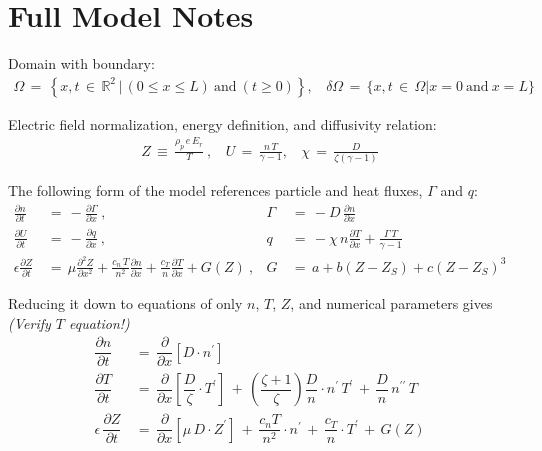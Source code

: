 \documentclass[a4paper,8pt]{article}
\date{}
\begin{document}
\hypertarget{full-model-notes}{%
\section{Full Model Notes}\label{full-model-notes}}

Domain with boundary: \begin{align}
    \Omega \,=\, \left\{x, t \,\in\, \mathbb{R}^2 \,|\, (0 \leq x \leq L) ~\text{and}~ (t \geq 0)\right\}, ~~~~ \delta\Omega \,=\, \{x, t \,\in\, \Omega | x = 0 ~\text{and}~ x = L \}
\end{align}

Electric field normalization, energy definition, and diffusivity
relation: \begin{align}
    Z \,\equiv\, \frac{\rho_p \, e \, E_r}{T}~, ~~~~ U \,=\, \frac{n\,T}{\gamma - 1}, ~~~~ \chi \,=\, \frac{D}{\zeta(\gamma - 1)}
\end{align}

The following form of the model references particle and heat fluxes,
\(\Gamma\) and \(q\): \begin{align}
    \frac{\partial n}{\partial t} \,&=\, -\frac{\partial \Gamma}{\partial x}~, &\Gamma \,&=\, -D \, \frac{\partial n}{\partial x} \\
    \frac{\partial U}{\partial t} \,&=\, -\frac{\partial q}{\partial x}~, &q \,&=\, -\chi \, n \frac{\partial T}{\partial x} + \frac{\Gamma\,T}{\gamma - 1} \\
    \epsilon \frac{\partial Z}{\partial t} \,&=\, \mu \frac{\partial^2 Z}{\partial x^2} + \frac{c_n \, T}{n^2} \frac{\partial n}{\partial x} + \frac{c_T}{n} \frac{\partial T}{\partial x} + G(Z)~, &G \,&=\, a + b(Z - Z_S) + c(Z - Z_S)^3
\end{align}

Reducing it down to equations of only \(n\), \(T\), \(Z\), and numerical
parameters gives \emph{(Verify \(T\) equation!)} \begin{align}
    \dfrac{\partial n}{\partial t} \,&=\, \dfrac{\partial}{\partial x}\left[D \cdot n^\prime\right] \\
    \dfrac{\partial T}{\partial t} \,&=\, \dfrac{\partial}{\partial x}\left[\dfrac{D}{\zeta} \cdot T^\prime\right] \,+\, \left(\dfrac{\zeta + 1}{\zeta}\right) \dfrac{D}{n} \cdot n^\prime \, T^\prime \,+\, \dfrac{D}{n} \, n^{\prime\prime} \, T \\
    \epsilon \, \dfrac{\partial Z}{\partial t} \,&=\, \dfrac{\partial}{\partial x}\left[\mu\,D \cdot Z^\prime\right] \,+\, \dfrac{c_n T}{n^2} \cdot n^\prime \,+\, \dfrac{c_T}{n} \cdot T^\prime \,+\, G(Z)
\end{align}
\end{document}
